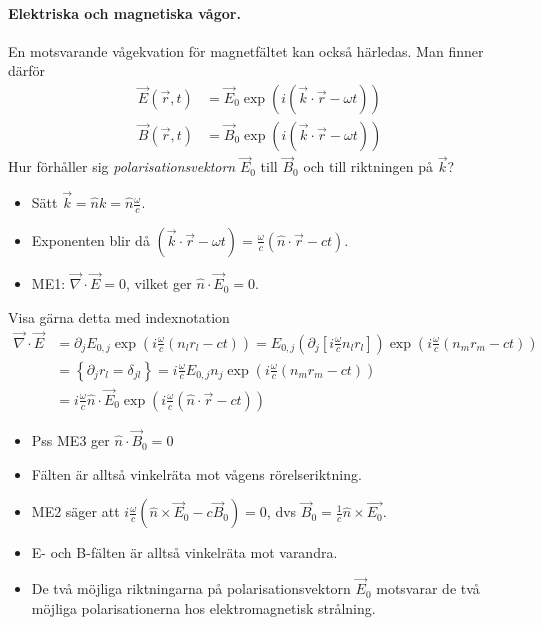 \documentclass[%
oneside,                 %
final,                   %
10pt]{article}
\begin{document}
\paragraph{Elektriska och magnetiska vågor.}
En motsvarande vågekvation för magnetfältet kan också härledas. Man finner därför
\begin{align}
\vec{E}(\vec{r},t) &= \vec{E}_0 \exp\left( i (\vec{k} \cdot \vec{r} - \omega t ) \right)  \nonumber \\
\vec{B}(\vec{r},t) &= \vec{B}_0 \exp\left( i (\vec{k} \cdot \vec{r} - \omega t ) \right)  \nonumber 
\end{align}
Hur förhåller sig \emph{polarisationsvektorn} $\vec{E}_0$ till $\vec{B}_0$ och till riktningen på $\vec{k}$?
\begin{itemize}
\item Sätt $\vec{k} = \hat{n} k = \hat{n} \frac{\omega}{c}$.

\item Exponenten blir då $(\vec{k} \cdot \vec{r} - \omega t ) = \frac{\omega}{c}(\hat{n} \cdot \vec{r} - c t )$.

\item ME1: $\vec{\nabla} \cdot \vec{E} = 0$, vilket ger $\hat{n} \cdot \vec{E}_0 = 0$.
\end{itemize}

\noindent
Visa gärna detta med indexnotation
\begin{align}
\vec{\nabla} \cdot \vec{E} &= \partial_j E_{0,j} \exp \left( i \frac{\omega}{c} (n_l r_l - ct) \right) = E_{0,j} \left( \partial_j \left[i \frac{\omega}{c} n_l r_l \right] \right) \exp \left( i \frac{\omega}{c} (n_m r_m - ct) \right) \nonumber \\
&= \left\{ \partial_j r_l = \delta_{jl} \right\} = i \frac{\omega}{c} E_{0,j} n_j \exp \left( i \frac{\omega}{c} (n_m r_m - ct) \right) \nonumber \\
&= i \frac{\omega}{c} \hat{n} \cdot \vec{E}_0 \exp \left( i \frac{\omega}{c} (\hat{n} \cdot \vec{r} - ct) \right) \nonumber
\end{align}
\begin{itemize}
\item Pss ME3 ger $\hat{n} \cdot \vec{B}_0 = 0$

\item Fälten är alltså vinkelräta mot vågens rörelseriktning.

\item ME2 säger att $i \frac{\omega}{c} (\hat{n} \times \vec{E}_0 - c \vec{B}_0) = 0$, dvs $\vec{B}_0 = \frac{1}{c} \hat{n} \times \vec{E_0}$.

\item E- och B-fälten är alltså vinkelräta mot varandra. 

\item De två möjliga riktningarna på polarisationsvektorn $\vec{E}_0$ motsvarar de två möjliga polarisationerna hos elektromagnetisk strålning.
\end{itemize}
\end{document}

